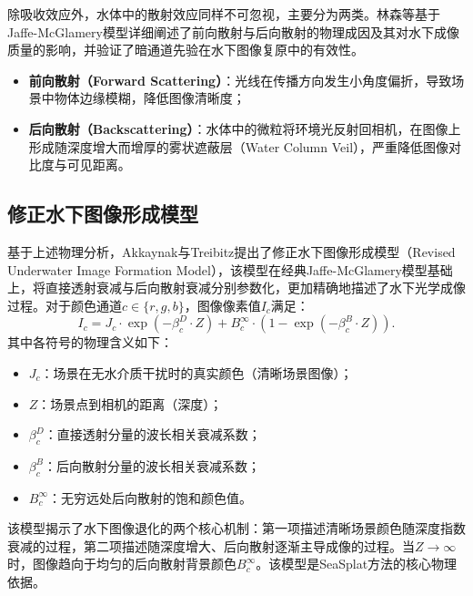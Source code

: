 除吸收效应外，水体中的散射效应同样不可忽视，主要分为两类。林森等基于Jaffe-McGlamery模型详细阐述了前向散射与后向散射的物理成因及其对水下成像质量的影响，并验证了暗通道先验在水下图像复原中的有效性。

\begin{itemize}
    \item \textbf{前向散射（Forward Scattering）}：光线在传播方向发生小角度偏折，导致场景中物体边缘模糊，降低图像清晰度；
    \item \textbf{后向散射（Backscattering）}：水体中的微粒将环境光反射回相机，在图像上形成随深度增大而增厚的雾状遮蔽层（Water Column Veil），严重降低图像对比度与可见距离。
\end{itemize}

\subsection{修正水下图像形成模型}

基于上述物理分析，Akkaynak与Treibitz提出了修正水下图像形成模型（Revised Underwater Image Formation Model），该模型在经典Jaffe-McGlamery模型基础上，将直接透射衰减与后向散射衰减分别参数化，更加精确地描述了水下光学成像过程。对于颜色通道$c \in \{r, g, b\}$，图像像素值$I_c$满足：
\begin{equation}
    I_c = J_c \cdot \exp\!\left(-\beta_c^D \cdot Z\right) + B_c^{\infty} \cdot \left(1 - \exp\!\left(-\beta_c^B \cdot Z\right)\right).
    \label{eq:underwater_model}
\end{equation}其中各符号的物理含义如下：
\begin{itemize}
    \item $J_c$：场景在无水介质干扰时的真实颜色（清晰场景图像）；
    \item $Z$：场景点到相机的距离（深度）；
    \item $\beta_c^D$：直接透射分量的波长相关衰减系数；
    \item $\beta_c^B$：后向散射分量的波长相关衰减系数；
    \item $B_c^{\infty}$：无穷远处后向散射的饱和颜色值。
\end{itemize}

该模型揭示了水下图像退化的两个核心机制：第一项描述清晰场景颜色随深度指数衰减的过程，第二项描述随深度增大、后向散射逐渐主导成像的过程。当$Z \to \infty$时，图像趋向于均匀的后向散射背景颜色$B_c^{\infty}$。该模型是SeaSplat方法的核心物理依据。

